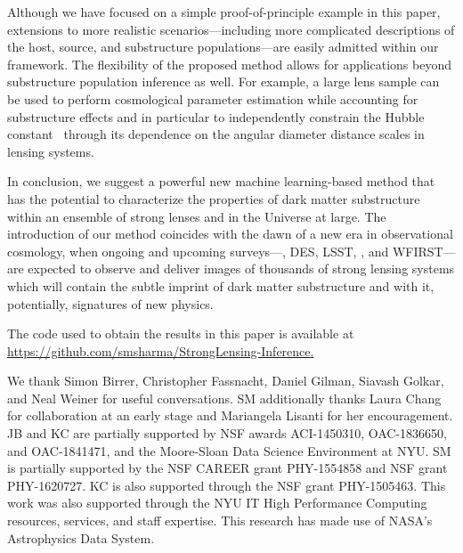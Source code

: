 \documentclass[twocolumn]{aastex62}
\begin{document}
Although we have focused on a simple proof-of-principle example in this paper, extensions to more realistic scenarios---including more complicated descriptions of the host, source, and substructure populations---are easily admitted within our framework. The flexibility of the proposed method allows for applications beyond substructure population inference as well. For example, a large lens sample can be used to perform cosmological parameter estimation while accounting for substructure effects and in particular to independently constrain the Hubble constant~\citep{1907.04869,1907.02533} through its dependence on the angular diameter distance scales in lensing systems.

In conclusion, we suggest a powerful new machine learning-based method that has the potential to characterize the properties of dark matter substructure within an ensemble of strong lenses and in the Universe at large. The introduction of our method coincides with the dawn of a new era in observational cosmology, when ongoing and upcoming surveys---\eg, DES, LSST, \Euclid, and WFIRST---are expected to observe and deliver images of thousands of strong lensing systems which will contain the subtle imprint of dark matter substructure and with it, potentially, signatures of new physics.

The code used to obtain the results in this paper is available at \url{https://github.com/smsharma/StrongLensing-Inference}\href{https://github.com/smsharma/StrongLensing-Inference}.


\acknowledgements

We thank Simon Birrer, Christopher Fassnacht, Daniel Gilman, Siavash Golkar, and Neal Weiner for useful conversations. SM additionally thanks Laura Chang for collaboration at an early stage and Mariangela Lisanti for her encouragement. JB and KC are partially supported by NSF awards ACI-1450310, OAC-1836650, and OAC-1841471, and the Moore-Sloan Data Science Environment at NYU. SM is partially supported by the NSF CAREER grant PHY-1554858 and NSF grant PHY-1620727. KC is also supported through the NSF grant PHY-1505463. This work was also supported through the NYU IT High Performance Computing resources, services, and staff expertise. This research has made use of NASA's Astrophysics Data System.

\end{document}
